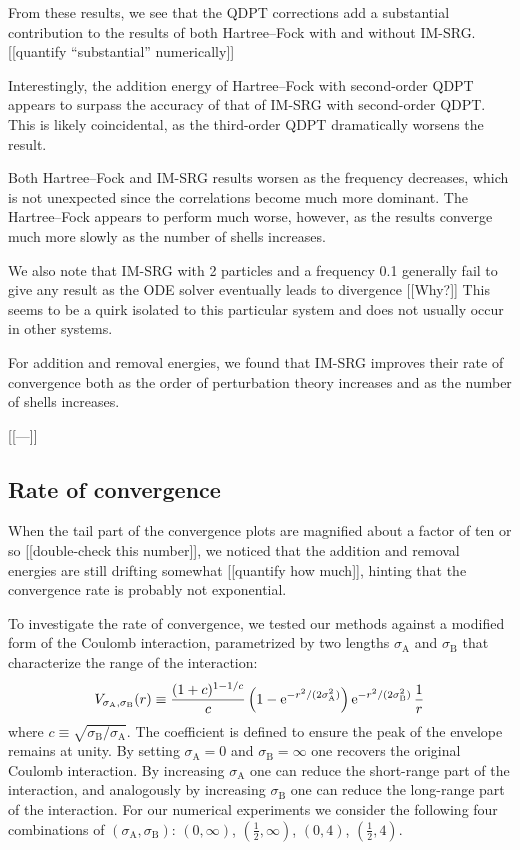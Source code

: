 From these results, we see that the QDPT corrections add a substantial contribution to the results of both Hartree--Fock with and without IM-SRG.  [[quantify ``substantial'' numerically]]

Interestingly, the addition energy of Hartree--Fock with second-order QDPT appears to surpass the accuracy of that of IM-SRG with second-order QDPT.  This is likely coincidental, as the third-order QDPT dramatically worsens the result.

Both Hartree--Fock and IM-SRG results worsen as the frequency decreases, which is not unexpected since the correlations become much more dominant.  The Hartree--Fock appears to perform much worse, however, as the results converge much more slowly as the number of shells increases.

We also note that IM-SRG with 2 particles and a frequency 0.1 generally fail to give any result as the ODE solver eventually leads to divergence [[Why?]]  This seems to be a quirk isolated to this particular system and does not usually occur in other systems.

For addition and removal energies, we found that IM-SRG improves their rate of convergence both as the order of perturbation theory increases and as the number of shells increases.

[[---]]

\subsection{Rate of convergence}

When the tail part of the convergence plots are magnified about a factor of ten or so [[double-check this number]], we noticed that the addition and removal energies are still drifting somewhat [[quantify how much]], hinting that the convergence rate is probably not exponential.

To investigate the rate of convergence, we tested our methods against a modified form of the Coulomb interaction, parametrized by two lengths $\sigma_{\mathrm{A}}$ and $\sigma_{\mathrm{B}}$ that characterize the range of the interaction:
\begin{align}
  V_{\sigma_{\mathrm{A}}, \sigma_{\mathrm{B}}}(r) \equiv \frac{(1 + c)^{1 - 1/c}}{c} \left(1 - \operatorname{e}^{-r^2 / (2 \sigma_{\mathrm{A}}^2)}\right) \operatorname{e}^{-r^2 / (2 \sigma_{\mathrm{B}}^2)} \frac{1}{r}
\end{align}
where $c \equiv \sqrt{\sigma_{\mathrm{B}} / \sigma_{\mathrm{A}}}$.  The coefficient is defined to ensure the peak of the envelope remains at unity.  By setting $\sigma_{\mathrm{A}} = 0$ and $\sigma_{\mathrm{B}} = \infty$ one recovers the original Coulomb interaction.  By increasing $\sigma_{\mathrm{A}}$ one can reduce the short-range part of the interaction, and analogously by increasing $\sigma_{\mathrm{B}}$ one can reduce the long-range part of the interaction.  For our numerical experiments we consider the following four combinations of $(\sigma_{\mathrm{A}}, \sigma_{\mathrm{B}})$: $(0, \infty)$, $(\frac{1}{2}, \infty)$, $(0, 4)$, $(\frac{1}{2}, 4)$.

